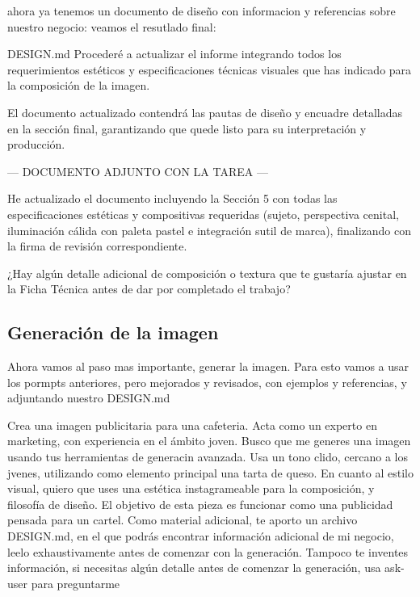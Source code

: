 \documentclass[12pt,a4paper]{article}
\begin{document}
ahora ya tenemos un documento de diseño con informacion y referencias sobre nuestro negocio: veamos el resutlado final:

\begin{result}{DESIGN.md}
    Procederé a actualizar el informe integrando todos los requerimientos estéticos y especificaciones técnicas visuales que has indicado para la composición de la imagen.

    El documento actualizado contendrá las pautas de diseño y encuadre detalladas en la sección final, garantizando que quede listo para su interpretación y producción.

    ---
    DOCUMENTO ADJUNTO CON LA TAREA
    ---

    He actualizado el documento incluyendo la Sección 5 con todas las especificaciones estéticas y compositivas requeridas (sujeto, perspectiva cenital, iluminación cálida con paleta pastel e integración sutil de marca), finalizando con la firma de revisión correspondiente.

    ¿Hay algún detalle adicional de composición o textura que te gustaría ajustar en la Ficha Técnica antes de dar por completado el trabajo?
\end{result}

\subsection{Generación de la imagen}

Ahora vamos al paso mas importante, generar la imagen. Para esto vamos a usar los pormpts anteriores, pero mejorados y revisados, con ejemplos y referencias, y adjuntando nuestro DESIGN.md

\begin{promptbox}
    Crea una imagen publicitaria para una cafeteria. Acta como un experto
    en marketing, con experiencia en el ámbito joven. Busco que me generes
    una imagen usando tus herramientas de generacin avanzada. Usa un tono
    clido, cercano a los jvenes, utilizando como elemento principal una
    tarta de queso. En cuanto al estilo visual, quiero que uses una estética instagrameable para la composición, y filosofía de diseño. El objetivo de esta pieza es funcionar como una publicidad
    pensada para un cartel.
    Como material adicional, te aporto un archivo DESIGN.md, en el que podrás encontrar información adicional de mi negocio, leelo exhaustivamente antes de comenzar con la generación. Tampoco te inventes información, si necesitas algún detalle antes de comenzar la generación, usa ask-user para preguntarme
\end{promptbox}
\end{document}
